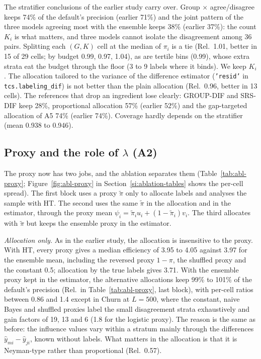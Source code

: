 The stratifier conclusions of the earlier study carry over. Group $\times$ agree/disagree keeps 74\% of the default's precision (earlier 71\%) and the joint pattern of the three models agreeing most with the ensemble keeps 38\% (earlier 37\%): the count $K_i$ is what matters, and three models cannot isolate the disagreement among 36 pairs. Splitting each $(G,K)$ cell at the median of $\pi_i$ is a tie (Rel.\ 1.01, better in 15 of 29 cells; by budget 0.99, 0.97, 1.04), as are tertile bins (0.99), whose extra strata eat the budget through the floor (3 to 9 labels where it binds). We keep $K_i$. The allocation tailored to the variance of the difference estimator (\texttt{'resid'} in \texttt{tcs.labeling\_dif}) is not better than the plain allocation (Rel.\ 0.96, better in 13 cells). The references that drop an ingredient lose clearly: GROUP-DIF and SRS-DIF keep 28\%, proportional allocation 57\% (earlier 52\%) and the gap-targeted allocation of A5 74\% (earlier 74\%). Coverage hardly depends on the stratifier (mean 0.938 to 0.946).

\subsection{Proxy and the role of $\lambda$ (A2)}

The proxy now has two jobs, and the ablation separates them (Table~\ref{tab:abl-proxy}; Figure~\ref{fig:abl-proxy} in Section~\ref{si:ablation-tables} shows the per-cell spread). The first block uses a proxy $\tilde\pi$ only to allocate labels and analyses the sample with HT. The second uses the same $\tilde\pi$ in the allocation and in the estimator, through the proxy mean $\psi_i=\tilde\pi_iu_i+(1-\tilde\pi_i)v_i$. The third allocates with $\tilde\pi$ but keeps the ensemble proxy in the estimator.

\emph{Allocation only.} As in the earlier study, the allocation is insensitive to the proxy. With HT, every proxy gives a median efficiency of 3.95 to 4.05 against 3.97 for the ensemble mean, including the reversed proxy $1-\pi$, the shuffled proxy and the constant 0.5; allocation by the true labels gives 3.71. With the ensemble proxy kept in the estimator, the alternative allocations keep 99\% to 101\% of the default's precision (Rel.\ in Table~\ref{tab:abl-proxy}, last block), with per-cell ratios between 0.86 and 1.4 except in Churn at $L=500$, where the constant, naive Bayes and shuffled proxies label the small disagreement strata exhaustively and gain factors of 19, 13 and 6 (1.8 for the logistic proxy). The reason is the same as before: the influence values vary within a stratum mainly through the differences $\hat y_{mi}-\hat y_{ji}$, known without labels. What matters in the allocation is that it is Neyman-type rather than proportional (Rel.\ 0.57).

